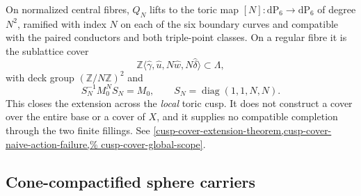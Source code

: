 \begin{auditrecord}
On normalized central fibres, \(Q_N\) lifts to the toric map
\([N]:\mathrm{dP}_6\to\mathrm{dP}_6\) of degree \(N^2\), ramified with
index \(N\) on each of the six boundary curves and compatible with the
paired conductors and both triple-point classes.  On a regular fibre it is
the sublattice cover
\[
 \mathbb Z\langle\widehat\gamma,\widehat u,
 N\widehat w,N\widehat\delta\rangle\subset\Lambda,
 \]
with deck group \((\mathbb Z/N\mathbb Z)^2\) and
\[
 S_N^{-1}M_0^NS_N=M_0,\qquad S_N=\operatorname{diag}(1,1,N,N).
\]
This closes the extension across the \emph{local} toric cusp.  It does not
construct a cover over the entire base or a cover of \(X\), and it supplies
no compatible completion through the two finite fillings.  See
\cref{cusp-cover-extension-theorem,cusp-cover-naive-action-failure,%
cusp-cover-global-scope}.
\end{auditrecord}

\subsection{Cone-compactified sphere carriers}


